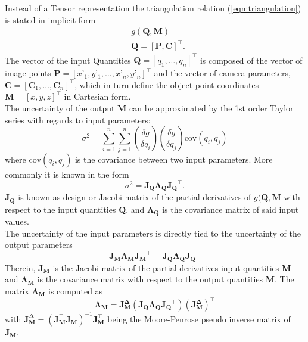\documentclass[5p,times,procedia]{elsarticle}
\begin{document}
Instead of a Tensor representation the triangulation relation (\ref{eqn:triangulation}) is stated in implicit form
%
\begin{equation}
	\label{eqn:ImplicitFrom}
	\begin{aligned}
		& g(\mathbf{Q},\mathbf{M}) \\
		& \mathbf{Q} = [\mathbf{P},\mathbf{C}]^{\top}.
	\end{aligned}
\end{equation}
%
The vector of the input Quantities $\mathbf{Q} = \left[q_1,\dots, q_{n}\right]^{\top}$ is composed of the vector of image points $\mathbf{P} = [x’_1,y’_1, \dots ,x’_n,y’_n]^{\top}$ and the vector of camera parameters, $\mathbf{C} = \left[ \mathbf{C}_1 , \dots , \mathbf{C}_n \right]^{\top}$, which in turn define the object point coordinates $\mathbf{M} =  [x,y,z]^{\top}$ in Cartesian form. \\
The uncertainty of the output $\mathbf{M}$ can be approximated by the 1st order Taylor series with regards to input parameters:
%
\begin{equation}
	\sigma^2 = \sum_{i=1}^{n}\sum_{j=1}^{n} \left(\frac{\delta g}{\delta q_i}\right) \left(\frac{\delta g}{\delta q_j}\right) \mathrm{cov}(q_i, q_j) 
\end{equation}
where $\mathrm{cov}(q_i, q_j) $ is the covariance between two input parameters. More commonly it is known in the form~\cite{Cox2006}  
\begin{equation}
	\sigma^2 = \mathbf{J_{Q}}\mathbf{\Lambda_{Q}}\mathbf{J_{Q}}^{\top}.
\end{equation}
$\mathbf{J_{Q}}$ is known as design or Jacobi matrix of the partial derivatives of $g(\mathbf{Q},\mathbf{M}$ with respect to the input quantities $\mathbf{Q}$, and $\mathbf{\Lambda_Q}$ is the covariance matrix of said input values. \\
The uncertainty of the input parameters is directly tied to the uncertainty of the output parameters
\begin{equation}
	\mathbf{J_{M}}\mathbf{\Lambda_{M}}\mathbf{J_{M}}^{\top} = \mathbf{J_{Q}}\mathbf{\Lambda_{Q}}\mathbf{J_{Q}}^{\top}
\end{equation}
Therein, $\mathbf{J_{M}}$ is the Jacobi matrix of the partial derivatives input quantities $\mathbf{M}$ and $\mathbf{\Lambda_{M}}$ is the covariance matrix with respect to the output quantities $\mathbf{M}$.
The matrix $\mathbf{\Lambda_{M}}$ is computed as
\begin{equation}
	\mathbf{\Lambda_{M}} = \mathbf{J_{M}^{\Delta}} \left( \mathbf{J_{Q}}\mathbf{\Lambda_{Q}}\mathbf{J_{Q}}^{\top}\right) \left(\mathbf{J_{M}^{\Delta}}\right)^{\top}
\end{equation}
with $ \mathbf{J_{M}^{\Delta}} = \left( \mathbf{J_{M}^{\top}} \mathbf{J_{M}^{}} \right)^{-1}\mathbf{J_{M}^{\top}}$ being the Moore-Penrose pseudo inverse matrix of $\mathbf{J_M}$.
%
\end{document}
